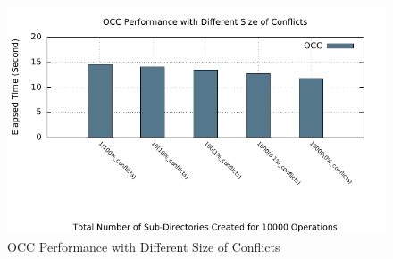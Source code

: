 \begin{figure}[ht]
	\centering
	\includegraphics[width=\linewidth]{figs/conflict.pdf}
	\caption{OCC Performance with Different Size of Conflicts}
	\label{fig:conflict}
\end{figure}

